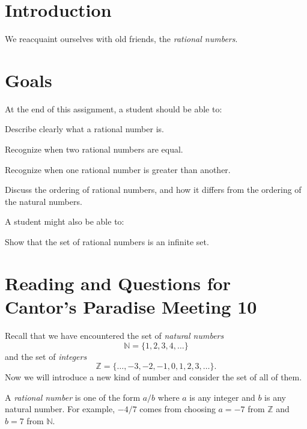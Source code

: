 \documentclass[12pt,letterpaper]{article}
\theoremstyle{definition}
\begin{document}
\setlength{\parskip}{1ex plus 0.5ex minus 0.2ex}
\setlength{\parindent}{0pt}

\pagestyle{fancy}
\cfoot{}

\section*{Introduction}
We reacquaint ourselves with old friends, the \emph{rational numbers}.

\section*{Goals}
At the end of this assignment, a student should be able to:
\begin{compactitem}
\item Describe clearly what a rational number is.
\item Recognize when two rational numbers are equal.
\item Recognize when one rational number is greater than another.
\item Discuss the ordering of rational numbers, and how it differs from the ordering of the natural numbers.
\end{compactitem}
A student might also be able to:
\begin{compactitem}
\item Show that the set of rational numbers is an infinite set.
\end{compactitem}

\section*{Reading and Questions for Cantor's Paradise Meeting 10}

Recall that we have encountered the set of \emph{natural numbers}
\[
\mathbb{N} = \{1, 2, 3, 4, \ldots\}
\]
and the set of \emph{integers}
\[
\mathbb{Z} = \{ \ldots, -3, -2, -1, 0, 1, 2, 3, \ldots\}.
\]
Now we will introduce a new kind of number and consider the set of all of them.

A \emph{rational number} is one of the form $a/b$ where $a$ is any integer and $b$ is any natural number. 
For example, $-4/7$ comes from choosing $a = -7$ from $\mathbb{Z}$ and $b= 7$ from $\mathbb{N}$.
\end{document}
